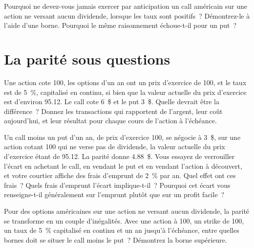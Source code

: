 \begin{question}\label{iq:iv2:options-parity-and-greeks:14}
Pourquoi ne devez-vous jamais exercer par anticipation un call américain sur une action ne versant aucun dividende, lorsque les taux sont positifs~? Démontrez-le à l'aide d'une borne. Pourquoi le même raisonnement échoue-t-il pour un put~?
\end{question}

\section{La parité sous questions}

\begin{question}\label{iq:iv2:options-parity-and-greeks:15}
Une action cote 100, les options d'un an ont un prix d'exercice de 100, et le taux est de 5~\%, capitalisé en continu, si bien que la valeur actuelle du prix d'exercice est d'environ 95.12. Le call cote 6~\$ et le put 3~\$. Quelle devrait être la différence~? Donnez les transactions qui rapportent de l'argent, leur coût aujourd'hui, et leur résultat pour chaque cours de l'action à l'échéance.
\end{question}

\begin{question}\label{iq:iv2:options-parity-and-greeks:16}
Un call moins un put d'un an, de prix d'exercice 100, se négocie à 3~\$, sur une action cotant 100 qui ne verse pas de dividende, la valeur actuelle du prix d'exercice étant de 95.12. La parité donne 4.88~\$. Vous essayez de verrouiller l'écart en achetant le call, en vendant le put et en vendant l'action à découvert, et votre courtier affiche des frais d'emprunt de 2~\% par an. Quel effet ont ces frais~? Quels frais d'emprunt l'écart implique-t-il~? Pourquoi cet écart vous renseigne-t-il généralement sur l'emprunt plutôt que sur un profit facile~?
\end{question}

\begin{question}\label{iq:iv2:options-parity-and-greeks:17}
Pour des options américaines sur une action ne versant aucun dividende, la parité se transforme en un couple d'inégalités. Avec une action à 100, un strike de 100, un taux de 5~\% capitalisé en continu et un an jusqu'à l'échéance, entre quelles bornes doit se situer le call moins le put~? Démontrez la borne supérieure.
\end{question}

